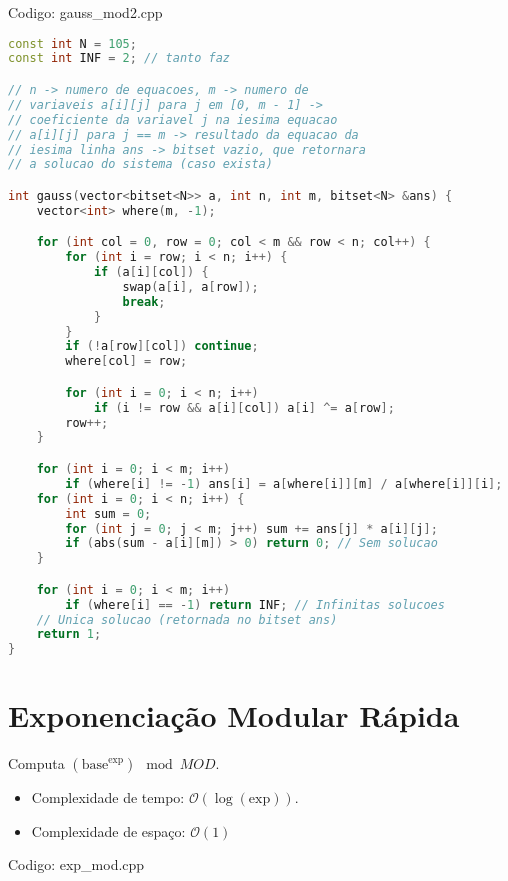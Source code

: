 \documentclass[10pt, a4paper, oneside]{book}
\begin{document}
\hfill

Codigo: gauss\_mod2.cpp

\begin{lstlisting}[language=C++]
const int N = 105;
const int INF = 2; // tanto faz

// n -> numero de equacoes, m -> numero de
// variaveis a[i][j] para j em [0, m - 1] ->
// coeficiente da variavel j na iesima equacao
// a[i][j] para j == m -> resultado da equacao da
// iesima linha ans -> bitset vazio, que retornara
// a solucao do sistema (caso exista)

int gauss(vector<bitset<N>> a, int n, int m, bitset<N> &ans) {
    vector<int> where(m, -1);

    for (int col = 0, row = 0; col < m && row < n; col++) {
        for (int i = row; i < n; i++) {
            if (a[i][col]) {
                swap(a[i], a[row]);
                break;
            }
        }
        if (!a[row][col]) continue;
        where[col] = row;

        for (int i = 0; i < n; i++)
            if (i != row && a[i][col]) a[i] ^= a[row];
        row++;
    }

    for (int i = 0; i < m; i++)
        if (where[i] != -1) ans[i] = a[where[i]][m] / a[where[i]][i];
    for (int i = 0; i < n; i++) {
        int sum = 0;
        for (int j = 0; j < m; j++) sum += ans[j] * a[i][j];
        if (abs(sum - a[i][m]) > 0) return 0; // Sem solucao
    }

    for (int i = 0; i < m; i++)
        if (where[i] == -1) return INF; // Infinitas solucoes
    // Unica solucao (retornada no bitset ans)
    return 1;
}
\end{lstlisting}
\hfill

\section{Exponenciação Modular Rápida}


Computa $(\text{base} ^ \text{exp}) \mod MOD$.



\begin{itemize}
\item Complexidade de tempo: $\mathcal{O}(\log(\text{exp}))$.
\item Complexidade de espaço: $\mathcal{O}(1)$
\end{itemize}

\hfill

Codigo: exp\_mod.cpp
\end{document}
